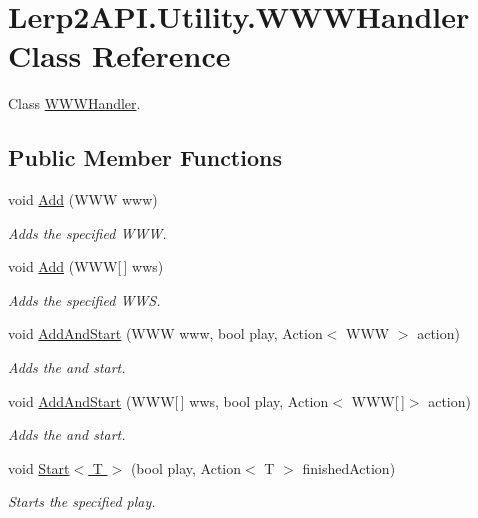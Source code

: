 \hypertarget{class_lerp2_a_p_i_1_1_utility_1_1_w_w_w_handler}{}\section{Lerp2\+A\+P\+I.\+Utility.\+W\+W\+W\+Handler Class Reference}
\label{class_lerp2_a_p_i_1_1_utility_1_1_w_w_w_handler}


Class \hyperlink{class_lerp2_a_p_i_1_1_utility_1_1_w_w_w_handler}{W\+W\+W\+Handler}.  


\subsection*{Public Member Functions}
\begin{DoxyCompactItemize}
\item 
void \hyperlink{class_lerp2_a_p_i_1_1_utility_1_1_w_w_w_handler_a36d2ece3a21c9632bc8c7ff5973fb44e}{Add} (W\+WW www)
\begin{DoxyCompactList}\small\item\em Adds the specified W\+WW. \end{DoxyCompactList}\item 
void \hyperlink{class_lerp2_a_p_i_1_1_utility_1_1_w_w_w_handler_adf39ab8531dd99efb01d138851377207}{Add} (W\+WW\mbox{[}$\,$\mbox{]} wws)
\begin{DoxyCompactList}\small\item\em Adds the specified W\+WS. \end{DoxyCompactList}\item 
void \hyperlink{class_lerp2_a_p_i_1_1_utility_1_1_w_w_w_handler_a6d0e43c73aecad2c445599fb114c3b07}{Add\+And\+Start} (W\+WW www, bool play, Action$<$ W\+WW $>$ action)
\begin{DoxyCompactList}\small\item\em Adds the and start. \end{DoxyCompactList}\item 
void \hyperlink{class_lerp2_a_p_i_1_1_utility_1_1_w_w_w_handler_a9c2f1541be109cf24e15eb593c4446b3}{Add\+And\+Start} (W\+WW\mbox{[}$\,$\mbox{]} wws, bool play, Action$<$ W\+WW\mbox{[}$\,$\mbox{]}$>$ action)
\begin{DoxyCompactList}\small\item\em Adds the and start. \end{DoxyCompactList}\item 
void \hyperlink{class_lerp2_a_p_i_1_1_utility_1_1_w_w_w_handler_a8b2930d0e2063175945f581429ff1a1f}{Start$<$ T $>$} (bool play, Action$<$ T $>$ finished\+Action)
\begin{DoxyCompactList}\small\item\em Starts the specified play. \end{DoxyCompactList}\end{DoxyCompactItemize}


